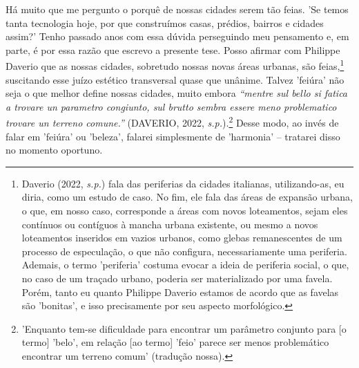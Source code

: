 \documentclass[]{report}
\begin{document}
	Há muito que me pergunto o porquê de nossas cidades serem tão feias. 'Se temos tanta tecnologia hoje, por que construímos casas, prédios, bairros e cidades assim?' Tenho passado anos com essa dúvida perseguindo meu pensamento e, em parte, é por essa razão que escrevo a presente tese. Posso afirmar com Philippe Daverio que as nossas cidades, sobretudo nossas novas áreas urbanas, são feias,\footnote[1]{Daverio (2022, \textit{s.p.}) fala das periferias da cidades italianas, utilizando-as, eu diria, como um estudo de caso. No fim, ele fala das áreas de expansão urbana, o que, em nosso caso, corresponde a áreas com novos loteamentos, sejam eles contínuos ou contíguos à mancha urbana existente, ou mesmo a novos loteamentos inseridos em vazios urbanos, como glebas remanescentes de um processo de especulação, o que não configura, necessariamente uma periferia. Ademais, o termo 'periferia' costuma evocar a ideia de periferia social, o que, no caso de um traçado urbano, poderia ser materializado por uma favela. Porém, tanto eu quanto Philippe Daverio estamos de acordo que as favelas são 'bonitas', e isso precisamente por seu aspecto morfológico.} suscitando esse juízo estético transversal quase que unânime. Talvez 'feiúra' não seja o que melhor define nossas cidades, muito embora \textit{“mentre sul bello si fatica a trovare un parametro congiunto, sul brutto sembra essere meno problematico trovare un terreno comune.”} (DAVERIO, 2022, \textit{s.p.}).\footnote[2]{'Enquanto tem-se dificuldade para encontrar um parâmetro conjunto para [o termo] 'belo', em relação [ao termo] 'feio' parece ser menos problemático encontrar um terreno comum' (tradução nossa).} Desse modo, ao invés de falar em 'feiúra' ou 'beleza', falarei simplesmente de 'harmonia' – tratarei disso no momento oportuno. 
	
\end{document}
